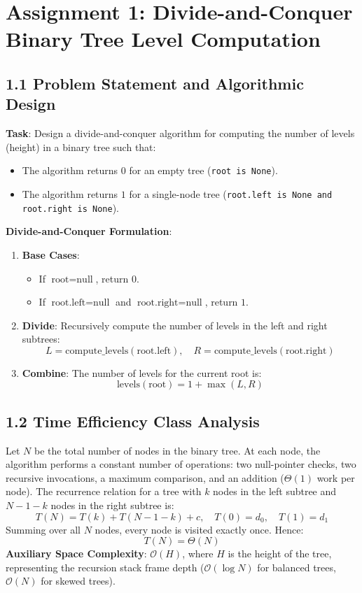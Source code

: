 \documentclass[12pt]{article}
\begin{document}
\section*{Assignment 1: Divide-and-Conquer Binary Tree Level Computation}

\subsection*{1.1 Problem Statement and Algorithmic Design}
\textbf{Task}: Design a divide-and-conquer algorithm for computing the number of levels (height) in a binary tree such that:
\begin{itemize}
    \item The algorithm returns $0$ for an empty tree (\texttt{root is None}).
    \item The algorithm returns $1$ for a single-node tree (\texttt{root.left is None and root.right is None}).
\end{itemize}

\textbf{Divide-and-Conquer Formulation}:
\begin{enumerate}
    \item \textbf{Base Cases}:
    \begin{itemize}
        \item If $\text{root} = \text{null}$, return $0$.
        \item If $\text{root.left} = \text{null}$ and $\text{root.right} = \text{null}$, return $1$.
    \end{itemize}
    \item \textbf{Divide}: Recursively compute the number of levels in the left and right subtrees:
    \[
    L = \text{compute\_levels}(\text{root.left}), \quad R = \text{compute\_levels}(\text{root.right})
    \]
    \item \textbf{Combine}: The number of levels for the current root is:
    \[
    \text{levels}(\text{root}) = 1 + \max(L, R)
    \]
\end{enumerate}

\subsection*{1.2 Time Efficiency Class Analysis}
Let $N$ be the total number of nodes in the binary tree.
At each node, the algorithm performs a constant number of operations: two null-pointer checks, two recursive invocations, a maximum comparison, and an addition ($\Theta(1)$ work per node).
The recurrence relation for a tree with $k$ nodes in the left subtree and $N - 1 - k$ nodes in the right subtree is:
\[
T(N) = T(k) + T(N - 1 - k) + c, \quad T(0) = d_0, \quad T(1) = d_1
\]
Summing over all $N$ nodes, every node is visited exactly once. Hence:
\[
T(N) = \Theta(N)
\]
\textbf{Auxiliary Space Complexity}: $\mathcal{O}(H)$, where $H$ is the height of the tree, representing the recursion stack frame depth ($\mathcal{O}(\log N)$ for balanced trees, $\mathcal{O}(N)$ for skewed trees).
\end{document}
